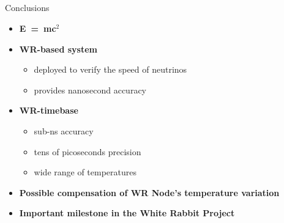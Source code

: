 \documentclass[compress,red]{beamer}
\begin{document}
\subsection{}
\begin{frame}{Conclusions}


    \begin{itemize}
      \item \textbf{E~=~mc$^2$} 
      \item \textbf{WR-based system} 
      \begin{itemize}
	  \item deployed to verify the speed of neutrinos
	  \item provides nanosecond accuracy
      \end{itemize}
\vspace{0.2cm}
      \item \textbf{WR-timebase} 
      \begin{itemize}
	  \item sub-ns accuracy 
	  \item tens of picoseconds precision 
          \item wide range of temperatures
      \end{itemize}
\vspace{0.2cm}
      \item \textbf{Possible compensation of WR Node's temperature variation}
\vspace{0.1cm}
      \item \textbf{Important milestone in the White Rabbit Project}

    \end{itemize}



\end{frame}
% 
% 
\end{document}
